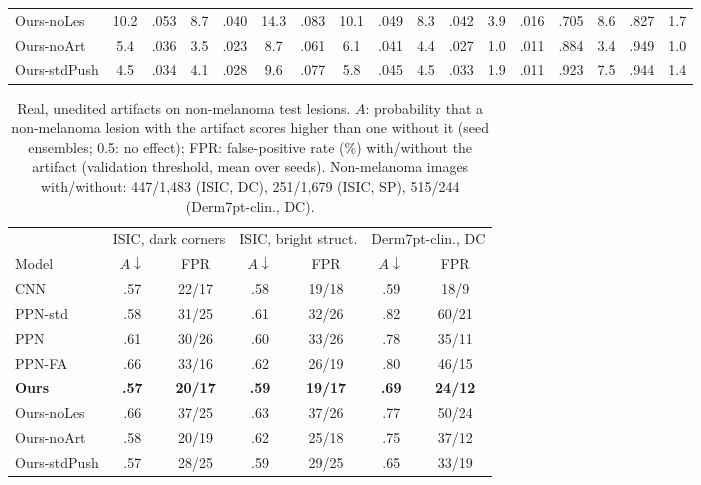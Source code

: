 \documentclass[conference]{IEEEtran}
\begin{document}
\begin{table}[t]
\begin{tabular}{l cc cc cc cc cc cc cc cc}
\midrule
Ours-noLes & 10.2 & .053 & 8.7 & .040 & 14.3 & .083 & 10.1 & .049 & 8.3 & .042 & 3.9 & .016 & .705 & 8.6 & .827 & 1.7 \\
Ours-noArt & 5.4 & .036 & 3.5 & .023 & 8.7 & .061 & 6.1 & .041 & 4.4 & .027 & 1.0 & .011 & .884 & 3.4 & .949 & 1.0 \\
Ours-stdPush & 4.5 & .034 & 4.1 & .028 & 9.6 & .077 & 5.8 & .045 & 4.5 & .033 & 1.9 & .011 & .923 & 7.5 & .944 & 1.4 \\
\bottomrule
\end{tabular}
\end{table}

\begin{table}[t]
\caption{Real, unedited artifacts on non-melanoma test lesions. $A$: probability that a non-melanoma lesion with the artifact scores higher than one without it (seed ensembles; 0.5: no effect); FPR: false-positive rate (\%) with/without the artifact (validation threshold, mean over seeds). Non-melanoma images with/without: 447/1{,}483 (ISIC, DC), 251/1{,}679 (ISIC, SP), 515/244 (Derm7pt-clin., DC).}
\label{tab:real}
\centering
\scriptsize
\setlength{\tabcolsep}{3.2pt}
\begin{tabular}{l|cc|cc|cc}
\toprule
& \multicolumn{2}{c|}{ISIC, dark corners} & \multicolumn{2}{c|}{ISIC, bright struct.} & \multicolumn{2}{c}{Derm7pt-clin., DC} \\
Model & $A\downarrow$ & FPR & $A\downarrow$ & FPR & $A\downarrow$ & FPR \\
\midrule
CNN & .57 & 22/17 & .58 & 19/18 & .59 & 18/9 \\
\midrule
PPN-std & .58 & 31/25 & .61 & 32/26 & .82 & 60/21 \\
PPN & .61 & 30/26 & .60 & 33/26 & .78 & 35/11 \\
PPN-FA & .66 & 33/16 & .62 & 26/19 & .80 & 46/15 \\
\textbf{Ours} & \textbf{.57} & \textbf{20/17} & \textbf{.59} & \textbf{19/17} & \textbf{.69} & \textbf{24/12} \\
\midrule
Ours-noLes & .66 & 37/25 & .63 & 37/26 & .77 & 50/24 \\
Ours-noArt & .58 & 20/19 & .62 & 25/18 & .75 & 37/12 \\
Ours-stdPush & .57 & 28/25 & .59 & 29/25 & .65 & 33/19 \\
\bottomrule
\end{tabular}
\end{table}
\end{document}
